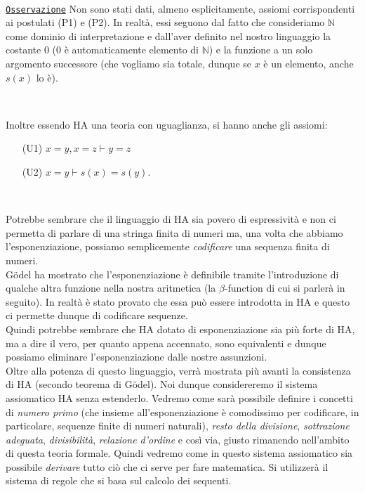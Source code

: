 \par\ \par\noindent
\underline{\texttt{Osservazione}} Non sono stati dati, almeno esplicitamente, assiomi corrispondenti ai postulati (P1) e (P2). In realt\`a, essi seguono dal fatto che consideriamo $\mathbb{N}$ come dominio di interpretazione e dall'aver definito nel nostro linguaggio la costante $0$ ($0$ \`e automaticamente elemento di $\mathbb{N}$) e la funzione a un solo argomento successore (che vogliamo sia totale, dunque se $x$ \`e un elemento, anche $s(x)$ lo \`e).
\par\ \par\noindent

\vspace{0.5 cm}
Inoltre essendo HA una teoria con uguaglianza, si hanno anche gli assiomi:
\begin{enumerate}
	\item[(U1)] $x=y,x=z\vdash y=z$
	\item[(U2)] $x=y\vdash s(x)=s(y). $
\end{enumerate}
\par\ \par

Potrebbe sembrare che il linguaggio di HA sia povero di espressivit\`a e non ci permetta di parlare di una stringa finita di numeri ma, una volta che abbiamo l'esponenziazione, possiamo semplicemente \textsl{codificare} una sequenza finita di numeri.\\ G\"odel ha mostrato che l'esponenziazione \`e definibile tramite l'introduzione di qualche altra funzione nella nostra aritmetica (la $\beta$-function di cui si parler\`a in seguito). In realt\`a \`e stato provato che essa pu\`o essere introdotta in HA e questo ci permette dunque di codificare sequenze.\\ Quindi potrebbe sembrare che HA dotato di esponenziazione sia pi\`u forte di HA, ma a dire il vero, per quanto appena accennato, sono equivalenti e dunque possiamo eliminare l'esponenziazione dalle nostre assunzioni.\\ Oltre alla potenza di questo linguaggio, verr\`a mostrata pi\`u avanti la consistenza di HA (secondo teorema di G\"odel).  Noi dunque considereremo il sistema assiomatico HA senza estenderlo. \newline
Vedremo come sar\`a possibile definire i concetti di \textsl{numero primo} (che insieme all'esponenziazione \`e comodissimo per codificare, in particolare, sequenze finite di numeri naturali), \textsl{resto della divisione}, \textsl{sottrazione adeguata}, \textsl{divisibilit\`a}, \textsl{relazione d'ordine} e cos\`i via, giusto rimanendo nell'ambito di questa teoria formale. Quindi vedremo come in questo sistema assiomatico sia possibile \textsl{derivare} tutto ci\`o che ci serve per fare matematica. \newline
Si utilizzer\`a il sistema di regole che si basa sul calcolo dei sequenti.

